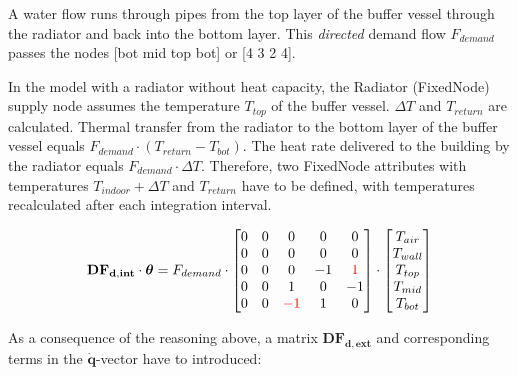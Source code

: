 A water flow runs through pipes from the top layer of the buffer vessel through the radiator and back into the bottom layer. This \emph{directed} demand flow $F_{demand}$ passes the nodes [bot mid top bot] or [4 3 2 4].

In the model with a radiator without heat capacity, the Radiator (\textsf{FixedNode}) supply node assumes the temperature $T_{top}$ of the buffer vessel. $\Delta T$ and $T_{return}$ are calculated. Thermal transfer from the radiator to the bottom layer of the buffer vessel equals $F_{demand} \cdot (T_{return} - T_{bot})$. The heat rate delivered to the building by the radiator equals $F_{demand} \cdot \Delta T$. 
Therefore, two \textsf{FixedNode} attributes with temperatures $T_{indoor} + \Delta T$ and $T_{return}$ have to be defined, with temperatures recalculated after each integration interval.

\begin{equation}
	\mathbf{DF_{d,int}} \cdot \boldsymbol{\theta} = 
	F_{demand} \cdot
	\begin{bmatrix}
		0 & 0 & 0 & 0 & 0 \\
		0 & 0 & 0 & 0 & 0 \\
		0 & 0 & 0 & -1 & \color{red}{1} \\
		0 & 0 & 1 & 0 & -1 \\
		0 & 0 & \color{red}{-1} & 1 & 0  
	\end{bmatrix}
	\cdot
	\begin{bmatrix}
		T_{air} \\
		T_{wall} \\
		T_{top} \\
		T_{mid} \\
		T_{bot}
	\end{bmatrix}
\end{equation}

As a consequence of the reasoning above, a matrix $\mathbf{DF_{d,ext}}$  and corresponding terms in the $\mathbf{\dot{q}}$-vector have to introduced:

